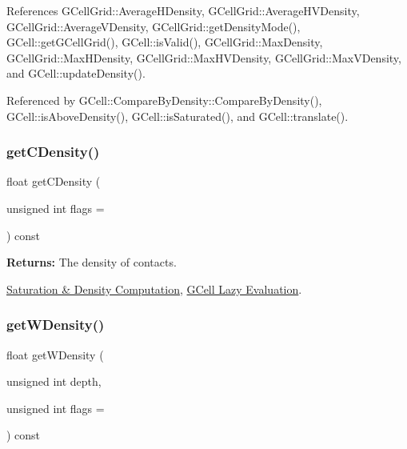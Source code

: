 References G\+Cell\+Grid\+::\+Average\+H\+Density, G\+Cell\+Grid\+::\+Average\+H\+V\+Density, G\+Cell\+Grid\+::\+Average\+V\+Density, G\+Cell\+Grid\+::get\+Density\+Mode(), G\+Cell\+::get\+G\+Cell\+Grid(), G\+Cell\+::is\+Valid(), G\+Cell\+Grid\+::\+Max\+Density, G\+Cell\+Grid\+::\+Max\+H\+Density, G\+Cell\+Grid\+::\+Max\+H\+V\+Density, G\+Cell\+Grid\+::\+Max\+V\+Density, and G\+Cell\+::update\+Density().



Referenced by G\+Cell\+::\+Compare\+By\+Density\+::\+Compare\+By\+Density(), G\+Cell\+::is\+Above\+Density(), G\+Cell\+::is\+Saturated(), and G\+Cell\+::translate().

\mbox{\label{classKatabatic_1_1GCell_ae56b981fad5960835faef809ec282cfa}} 
\subsubsection{\texorpdfstring{get\+C\+Density()}{getCDensity()}}
{\footnotesize\ttfamily float get\+C\+Density (\begin{DoxyParamCaption}\item[{unsigned int}]{flags = {} }\end{DoxyParamCaption}) const\hspace{0.3cm}{\ttfamily [inline]}}

{\bfseries Returns\+:} The density of contacts.

\hyperlink{classKatabatic_1_1GCell_secGCellDensity}{Saturation \& Density Computation}, \hyperlink{classKatabatic_1_1GCell_secGCellLazyEvaluation}{G\+Cell Lazy Evaluation}. \mbox{\label{classKatabatic_1_1GCell_aa64538731e911c60eeaea557be1c7740}} 
\subsubsection{\texorpdfstring{get\+W\+Density()}{getWDensity()}}
{\footnotesize\ttfamily float get\+W\+Density (\begin{DoxyParamCaption}\item[{unsigned int}]{depth,  }\item[{unsigned int}]{flags = {} }\end{DoxyParamCaption}) const\hspace{0.3cm}{\ttfamily [inline]}}

